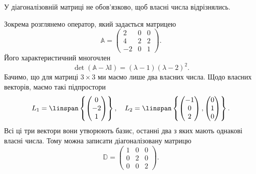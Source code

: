 \documentclass{math_library}
\begin{document}

\begin{remark}
У діагоналізовній матриці не обов'язково, щоб власні числа відрізнялись.
\end{remark}

\begin{example}
Зокрема розглянемо оператор, який задається матрицею 
\[
\mathbb{A} = \begin{pmatrix}
2 & 0 & 0 \\
4 & 2 & 2 \\
-2 & 0 & 1
\end{pmatrix}.
\]
Його характеристичний многочлен 
\[
\det (\mathbb{A}-\lambda \mathbb{I}) = (\lambda-1)(\lambda-2)^2.
\]
Бачимо, що для матриці $3 \times 3$ ми маємо лише два власних числа. Щодо власних векторів, маємо такі підпростори
\begin{align*}
L_1 = \linspan \left\{ \begin{pmatrix}
0 \\ -2 \\ 1
\end{pmatrix} \right\},\quad L_2 = \linspan \left\{ \begin{pmatrix}
-1 \\ 0 \\ 2
\end{pmatrix}, \begin{pmatrix}
0 \\ 1 \\ 0
\end{pmatrix} \right\}.
\end{align*}
Всі ці три вектори вони утворюють базис, останні два з яких мають однакові власні числа. Тому можна записати діагоналізовану матрицю 
\[
\mathbb{D} = \begin{pmatrix}
1 & 0 & 0 \\
0 & 2 & 0 \\
0 & 0 & 2
\end{pmatrix}.
\]
\end{example}
\end{document}
